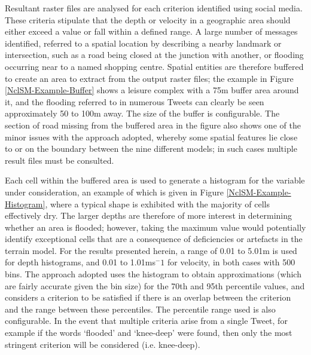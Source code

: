 Resultant raster files are analysed for each criterion identified using social media. These criteria stipulate that the depth or velocity in a geographic area should either exceed a value or fall within a defined range. A large number of messages identified, referred to a spatial location by describing a nearby landmark or intersection, such as a road being closed at the junction with another, or flooding occurring near to a named shopping centre. Spatial entities are therefore buffered to create an area to extract from the output raster files; the example in Figure \ref{NclSM-Example-Buffer} shows a leisure complex with a 75m buffer area around it, and the flooding referred to in numerous Tweets can clearly be seen approximately 50 to 100m away. The size of the buffer is configurable. The section of road missing from the buffered area in the figure also shows one of the minor issues with the approach adopted, whereby some spatial features lie close to or on the boundary between the nine different models; in such cases multiple result files must be consulted.

Each cell within the buffered area is used to generate a histogram for the variable under consideration, an example of which is given in Figure \ref{NclSM-Example-Histogram}, where a typical shape is exhibited with the majority of cells effectively dry. The larger depths are therefore of more interest in determining whether an area is flooded; however, taking the maximum value would potentially identify exceptional cells that are a consequence of deficiencies or artefacts in the terrain model. For the results presented herein, a range of 0.01 to 5.01m is used for depth histograms, and 0.01 to 1.01ms$^-1$ for velocity, in both cases with 500 bins. The approach adopted uses the histogram to obtain approximations (which are fairly accurate given the bin size) for the 70th and 95th percentile values, and considers a criterion to be satisfied if there is an overlap between the criterion and the range between these percentiles. The percentile range used is also configurable. In the event that multiple criteria arise from a single Tweet, for example if the words ‘flooded’ and ‘knee-deep’ were found, then only the most stringent criterion will be considered (i.e. knee-deep).


